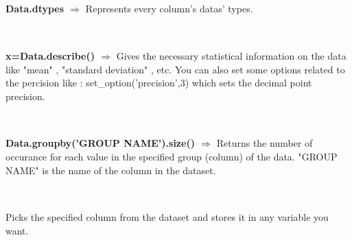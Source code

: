 \documentclass[a4paper,18pt]{article}
\begin{document}

\subsection{\colorbox {matgreen}{\color{white}{\large Data.dtypes}}}
\textbf{Data.dtypes $\Rightarrow$} Represents every column's datas' types. \\\\



\subsection{\colorbox {matgreen}{\color{white}{\large Data.describe()}}}
\textbf{x=Data.describe() $\Rightarrow$} Gives the necessary statistical information on the data like "mean" , "standard deviation" , etc. You can also set some options related to the percision like : set\_option('precision',3) which sets the decimal point precision. \\\\



\subsection{\colorbox {matgreen}{\color{white}{\large Data.groupby('GROUP NAME').size()}}}
\textbf{Data.groupby('GROUP NAME').size() $\Rightarrow$} Returns the number of occurance for each value in the specified group (column) of the data. "GROUP NAME" is the name of the column in the dataset.\\\\


\subsection{\colorbox {matgreen}{\color{white}{\large Data.pop('GROUP NAME')}}}
Picks the specified column from the dataset and stores it in any variable you want.\\\\
\end{document}
